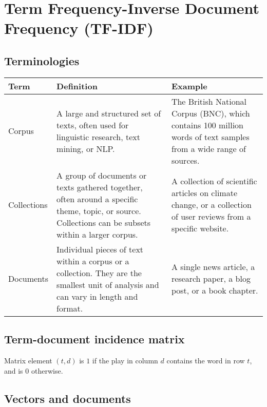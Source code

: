 \chapter{Term Frequency-Inverse Document Frequency (TF-IDF) \cite{nlp-1}} \label{Term Frequancy-Inverse Document Frequency (TF-IDF)}


\section{Terminologies \cite{nlp-1, chatgpt}}
\begin{table}[h!]
    \centering
    \begin{tabular}{| m{2   cm} | m{6cm} | m{6cm} |}
        \hline
        \textbf{Term} & \textbf{Definition} & \textbf{Example} \\
        \hline
        Corpus & A large and structured set of texts, often used for linguistic research, text mining, or NLP. & The British National Corpus (BNC), which contains 100 million words of text samples from a wide range of sources. \\
        \hline
        Collections & A group of documents or texts gathered together, often around a specific theme, topic, or source. Collections can be subsets within a larger corpus. & A collection of scientific articles on climate change, or a collection of user reviews from a specific website. \\
        \hline
        Documents & Individual pieces of text within a corpus or a collection. They are the smallest unit of analysis and can vary in length and format. & A single news article, a research paper, a blog post, or a book chapter. \\
        \hline
    \end{tabular}
\end{table}


\section{Term-document incidence matrix \cite{ir-1}}\label{Term-document incidence matrix}

Matrix element $(t, d)$ is $1$ if the play in column $d$ contains the word in row $t$, and is $0$ otherwise.





\section{Vectors and documents \cite{nlp-1}}\label{tf-idf: Vectors and documents}

